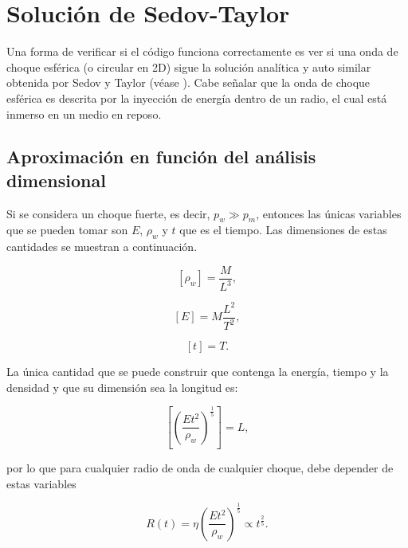 \documentclass[12pt,a4paper]{book}
\begin{document}


\section{Solución de Sedov-Taylor} \label{sec:sedov_taylor}

Una forma de verificar si el código funciona correctamente es ver si una onda de choque esférica (o circular en 2D) sigue la solución analítica y auto similar obtenida por Sedov y Taylor (véase \citet{PAFD}). 
Cabe señalar que la onda de choque esférica es descrita por la inyección de energía dentro de un radio, el cual está inmerso en un medio en reposo. 

\subsection{Aproximación en función del análisis dimensional}
Si se considera un choque fuerte,
es decir, $p_w \gg p_m$,
entonces las únicas variables que se pueden tomar son $E$, $\rho_w$ y $t$ que es el tiempo.
Las dimensiones de estas cantidades se muestran a continuación. 

\begin{equation}
  \left[ \rho_w \right] = \frac{M}{L^3},
\end{equation}

\begin{equation}
  \left[E\right] = M \frac{L^2}{T^2},
\end{equation}

\begin{equation}
  \left[ t\right] = T.
\end{equation}

\noindent La única cantidad que se puede construir que contenga la energía, tiempo y la densidad y que su dimensión sea la longitud es:

\begin{equation}
  \left[ \left( \frac{Et^2}{ \rho_w } \right)^{\frac{1}{5}}\right] = L,
\end{equation}

\noindent por lo que para cualquier radio de onda de cualquier choque, debe depender de estas variables

\begin{equation}
  R(t) = \eta  \left( \frac{Et^2}{ \rho_w } \right)^{\frac{1}{5}} \varpropto t^{\frac{2}{5}}.
\end{equation}
\end{document}
